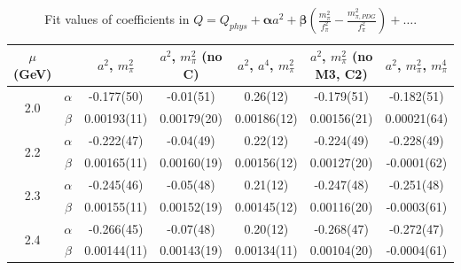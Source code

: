 \documentclass[12pt]{extarticle}
\begin{document}
\begin{table}[h!]
\begin{center}
\begin{tabular}{|c c|c|c|c|c|c|}
\hline
$\mu$ (GeV) &  & $a^2$, $m_\pi^2$& $a^2$, $m_\pi^2$ (no C)& $a^2$, $a^4$, $m_\pi^2$& $a^2$, $m_\pi^2$ (no M3, C2)& $a^2$, $m_\pi^2$, $m_\pi^4$\\
\hline
\multirow{2}{0.5in}{2.0} & $\alpha$ & -0.177(50)& -0.01(51)& 0.26(12)& -0.179(51)& -0.182(51)\\
 & $\beta$ & 0.00193(11)& 0.00179(20)& 0.00186(12)& 0.00156(21)& 0.00021(64)\\
\hline
\multirow{2}{0.5in}{2.2} & $\alpha$ & -0.222(47)& -0.04(49)& 0.22(12)& -0.224(49)& -0.228(49)\\
 & $\beta$ & 0.00165(11)& 0.00160(19)& 0.00156(12)& 0.00127(20)& -0.0001(62)\\
\hline
\multirow{2}{0.5in}{2.3} & $\alpha$ & -0.245(46)& -0.05(48)& 0.21(12)& -0.247(48)& -0.251(48)\\
 & $\beta$ & 0.00155(11)& 0.00152(19)& 0.00145(12)& 0.00116(20)& -0.0003(61)\\
\hline
\multirow{2}{0.5in}{2.4} & $\alpha$ & -0.266(45)& -0.07(48)& 0.20(12)& -0.268(47)& -0.272(47)\\
 & $\beta$ & 0.00144(11)& 0.00143(19)& 0.00134(11)& 0.00104(20)& -0.0004(61)\\
\hline
\end{tabular}
\caption{Fit values of coefficients in $Q = Q_{phys} + \mathbf{\alpha} a^2 + \mathbf{\beta}\left(\frac{m_\pi^2}{f_\pi^2}-\frac{m_{\pi,PDG}^2}{f_\pi^2}\right) + \ldots$.}
\end{center}
\end{table}




















\clearpage
\end{document}
